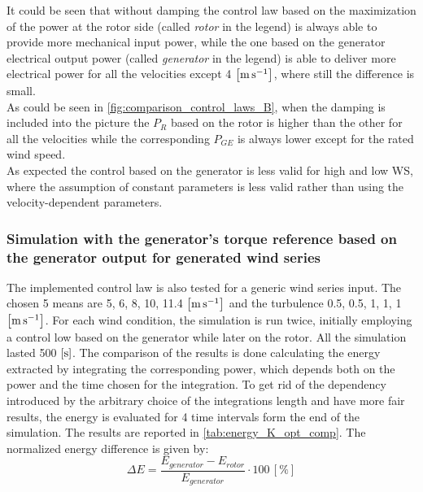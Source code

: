 It could be seen that without damping the control law based on the maximization of the power at the rotor side (called \textit{rotor} in the legend) is always able to provide more mechanical input power, while the one based on the generator electrical output power (called \textit{generator} in the legend) is able to deliver more electrical power for all the velocities except 4 $\left[\si{\meter\per\second}\right]$, where still the difference is small.  \\
As could be seen in \autoref{fig:comparison_control_laws_B}, when the damping is included into the picture the $P_R$ based on the rotor is higher than the other for all the velocities while the corresponding $P_{GE}$ is always lower except for the rated wind speed.\\
As expected the control based on the generator is less valid for high and low WS, where the assumption of constant parameters is less valid rather than using the velocity-dependent parameters. 

\subsubsection{Simulation with the generator's torque reference based on the generator output for generated wind series}
The implemented control law is also tested for a generic wind series input. The chosen 5 means are 5, 6, 8, 10, 11.4 $\left[\si{\meter\per\second}\right]$ and the turbulence 0.5, 0.5, 1, 1, 1 $\left[\si{\meter\per\second}\right]$. For each wind condition, the simulation is run twice, initially employing a control low based on the generator while later on the rotor. All the simulation lasted 500 $\left[\si{\second}\right]$. The comparison of the results is done calculating the energy extracted by integrating the corresponding power, which depends both on the power and the time chosen for the integration. To get rid of the dependency introduced by the arbitrary choice of the integrations length and have more fair results, the energy is evaluated for 4 time intervals form the end of the simulation. The results are reported in \autoref{tab:energy_K_opt_comp}. The normalized energy difference is given by:
\begin{equation}
  \Delta E = \frac{E_{generator} - E_{rotor}}{E_{generator}}\cdot 100 \, \left[\%\right]
\end{equation}

